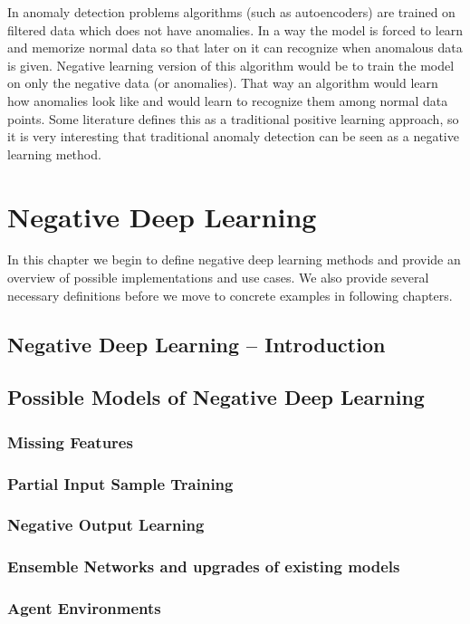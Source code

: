 \documentclass[b5paper]{book}
\begin{document}
In anomaly detection problems algorithms (such as autoencoders) are trained on filtered data which does not have anomalies. In a way the model is forced to learn and memorize normal data so that later on it can recognize when anomalous data is given. Negative learning version of this algorithm would be to train the model on only the negative data (or anomalies). That way an algorithm would learn how anomalies look like and would learn to recognize them among normal data points. Some literature defines this as a traditional positive learning approach, so it is very interesting that traditional anomaly detection can be seen as a negative learning method.

\chapter{Negative Deep Learning}

In this chapter we begin to define negative deep learning methods and provide an overview of possible implementations and use cases. We also provide several necessary definitions before we move to concrete examples in following chapters.

\section{Negative Deep Learning -- Introduction}
\section{Possible Models of Negative Deep Learning}
\subsection{Missing Features}
\subsection{Partial Input Sample Training}
\subsection{Negative Output Learning}
\subsection{Ensemble Networks and upgrades of existing models}
\subsection{Agent Environments}
\end{document}

